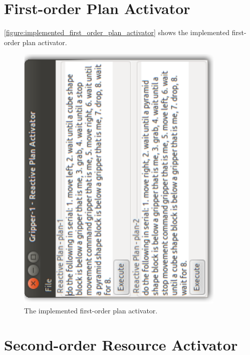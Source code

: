 \section{First-order Plan Activator}

{\mbox{\autoref{figure:implemented_first_order_plan_activator}}} shows
the implemented first-order plan activator.
\begin{figure}
\includegraphics[width=10cm]{gfx/implemented_first_order_plan_activator}
\caption[The implemented first-order plan activator.]{The implemented
  first-order plan activator.}
\label{figure:implemented_first_order_plan_activator}
\end{figure}

\section{Second-order Resource Activator}

